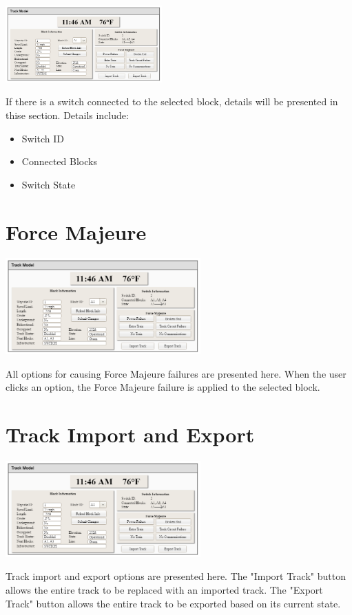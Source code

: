 \documentclass{scrreprt}
\begin{document}
\begin{center}
    \includegraphics[trim={14.2cm 5.75cm .5cm 3.6cm},clip,width=6cm]{track-model}
\end{center}

If there is a switch connected to the selected block, details will be presented in
thise section. Details include:
\begin{itemize}
    \item Switch ID
    \item Connected Blocks
    \item Switch State
\end{itemize}

\section{Force Majeure}

\begin{center}
    \includegraphics[trim={14.2cm 1.75cm .5cm 6.5cm},clip,width=7.5cm]{track-model}
\end{center}

All options for causing Force Majeure failures are presented here. When the user clicks
an option, the Force Majeure failure is applied to the selected block.

\section{Track Import and Export}

\begin{center}
    \includegraphics[trim={14.2cm .5cm .5cm 10.75cm},clip,width=7.5cm]{track-model}
\end{center}

Track import and export options are presented here. The "Import Track" button allows
the entire track to be replaced with an imported track. The "Export Track" button allows
the entire track to be exported based on its current state.
\end{document}
